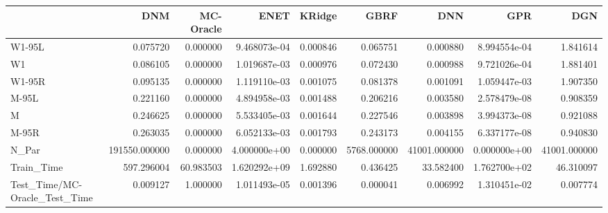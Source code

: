 \begin{tabular}{lrrrrrrrr}
\toprule
{} &            DNM &  MC-Oracle &          ENET &    KRidge &         GBRF &           DNN &           GPR &           DGN \\
\midrule
W1-95L                        &       0.075720 &   0.000000 &  9.468073e-04 &  0.000846 &     0.065751 &      0.000880 &  8.994554e-04 &      1.841614 \\
W1                            &       0.086105 &   0.000000 &  1.019687e-03 &  0.000976 &     0.072430 &      0.000988 &  9.721026e-04 &      1.881401 \\
W1-95R                        &       0.095135 &   0.000000 &  1.119110e-03 &  0.001075 &     0.081378 &      0.001091 &  1.059447e-03 &      1.907350 \\
M-95L                         &       0.221160 &   0.000000 &  4.894958e-03 &  0.001488 &     0.206216 &      0.003580 &  2.578479e-08 &      0.908359 \\
M                             &       0.246625 &   0.000000 &  5.533405e-03 &  0.001644 &     0.227546 &      0.003898 &  3.994373e-08 &      0.921088 \\
M-95R                         &       0.263035 &   0.000000 &  6.052133e-03 &  0.001793 &     0.243173 &      0.004155 &  6.337177e-08 &      0.940830 \\
N\_Par                         &  191550.000000 &   0.000000 &  4.000000e+00 &  0.000000 &  5768.000000 &  41001.000000 &  0.000000e+00 &  41001.000000 \\
Train\_Time                    &     597.296004 &  60.983503 &  1.620292e+09 &  1.692880 &     0.436425 &     33.582400 &  1.762700e+02 &     46.310097 \\
Test\_Time/MC-Oracle\_Test\_Time &       0.009127 &   1.000000 &  1.011493e-05 &  0.001396 &     0.000041 &      0.006992 &  1.310451e-02 &      0.007774 \\
\bottomrule
\end{tabular}
